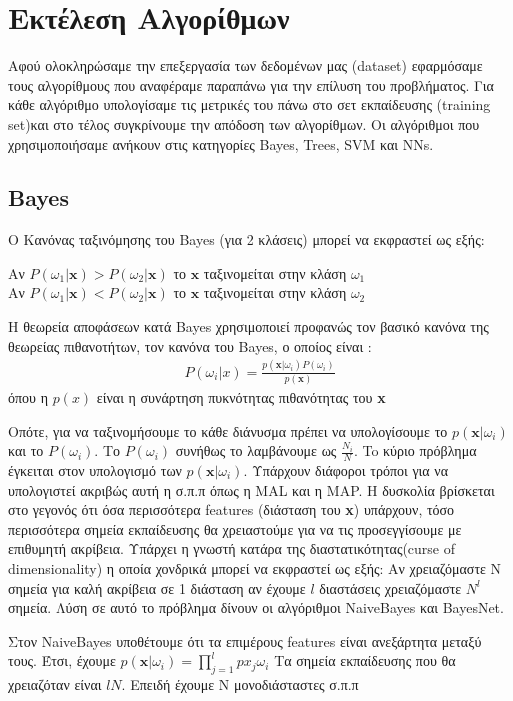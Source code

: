 \chapter{Εκτέλεση Αλγορίθμων}
Αφού ολοκληρώσαμε την επεξεργασία των δεδομένων μας (dataset) εφαρμόσαμε τους αλγορίθμους που αναφέραμε παραπάνω για την επίλυση του προβλήματος. Για κάθε αλγόριθμο υπολογίσαμε τις μετρικές του πάνω στο σετ εκπαίδευσης (training set)και στο τέλος συγκρίνουμε την απόδοση των αλγορίθμων. Οι αλγόριθμοι που χρησιμοποιήσαμε ανήκουν στις κατηγορίες Bayes, Trees, SVM και NNs.

\section{Bayes}
O Κανόνας ταξινόμησης του Βayes (για 2 κλάσεις) μπορεί να εκφραστεί ως εξής:
\begin{center}
Αν $P(\omega_1|\mathbf{x}) > P(\omega_2|\mathbf{x})$ το $\mathbf{x} $ ταξινομείται στην κλάση
$\omega_1$\\
Αν $P(\omega_1|\mathbf{x}) < P(\omega_2|\mathbf{x})$ το $\mathbf{x} $ ταξινομείται στην κλάση
$\omega_2$
\end{center}

Η θεωρεία αποφάσεων κατά Bayes χρησιμοποιεί προφανώς τον βασικό κανόνα της θεωρείας πιθανοτήτων,
τον κανόνα του Bayes, ο οποίος είναι :
\begin{align*}
P(\omega_i|x) = \frac{p(\mathbf{x}|\omega_i)P(\omega_i)}{p(\mathbf{x})}
\end{align*}
όπου η $p(x)$ είναι η συνάρτηση πυκνότητας πιθανότητας του  \textbf{x}

Οπότε, για να ταξινομήσουμε το κάθε διάνυσμα πρέπει να υπολογίσουμε το $p(\mathbf{x}|\omega_i)$ και το
$P(\omega_i) $.
Το $ P(\omega_i)$ συνήθως το λαμβάνουμε ως $\frac{N_i}{N}$.
To κύριο πρόβλημα έγκειται
στον υπολογισμό των $p(\mathbf{x}|\omega_i)$.
Υπάρχουν διάφοροι τρόποι για να υπολογιστεί ακριβώς
αυτή  η σ.π.π όπως η MAL και η MAP.
Η δυσκολία βρίσκεται στο γεγονός ότι όσα περισσότερα features (διάσταση του  \textbf{x})
υπάρχουν, τόσο περισσότερα σημεία εκπαίδευσης θα χρειαστούμε για να τις
προσεγγίσουμε με επιθυμητή ακρίβεια.
Υπάρχει η γνωστή κατάρα της διαστατικότητας(curse of dimensionality)
η οποία χονδρικά μπορεί να εκφραστεί ως εξής:
Αν χρειαζόμαστε Ν σημεία για καλή ακρίβεια σε 1 διάσταση αν έχουμε $l$ διαστάσεις χρειαζόμαστε $N^l$ σημεία.
Λύση σε αυτό το πρόβλημα δίνουν οι αλγόριθμοι NaiveBayes και BayesNet.

Στον NaiveBayes υποθέτουμε ότι τα επιμέρους features είναι ανεξάρτητα μεταξύ τους.
Έτσι, έχουμε
$p(\mathbf{x}|\omega_i) = \prod_{j=1}^lp{x_j}{\omega_i}$
Τα σημεία εκπαίδευσης που θα χρειαζόταν είναι $lN$.
Επειδή έχουμε Ν μονοδιάσταστες σ.π.π

